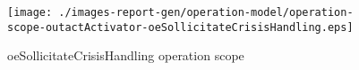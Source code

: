 \begin{figure}[htbp]
\begin{center}

\texttt{[image: ./images-report-gen/operation-model/operation-scope-outactActivator-oeSollicitateCrisisHandling.eps]}
\end{center}
\caption[lu.uni.lassy.excalibur.examples.icrash Operation Scope: operation-scope-outactActivator-oeSollicitateCrisisHandling]{oeSollicitateCrisisHandling operation scope
}
\label{fig:lu.uni.lassy.excalibur.examples.icrash-OM-scopeView-operation-scope-outactActivator-oeSollicitateCrisisHandling}
\end{figure}
\vspace{0.5cm}

